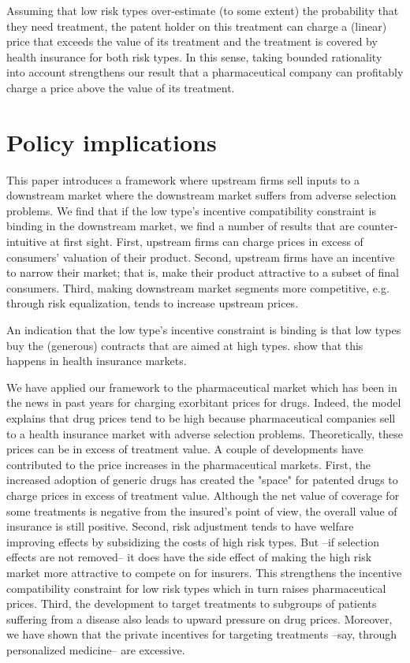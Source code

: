 \documentclass[12pt,english,a4paper]{article}
\begin{document}
Assuming that low risk types over-estimate (to some extent) the probability that they need treatment, the patent holder on this treatment can charge a (linear) price that exceeds the value of its treatment and the treatment is covered by health insurance for both risk types. In this sense, taking bounded rationality into account strengthens our result that a pharmaceutical company can profitably charge a price above the value of its treatment.

\section{Policy implications}
\label{sec:org67f9879}

This paper introduces a framework where upstream firms sell inputs to a downstream market where the downstream market suffers from adverse selection problems. We find that if the low type's incentive compatibility constraint is binding in the downstream market, we find a number of results that are counter-intuitive at first sight. First, upstream firms can charge prices in excess of consumers' valuation of their product. Second, upstream firms have an incentive to narrow their market; that is, make their product attractive to a subset of final consumers. Third, making downstream market segments more competitive, e.g. through risk equalization, tends to increase upstream prices.

An indication that the low type's incentive constraint is binding is that low types buy the (generous) contracts that are aimed at high types. \cite{handel-2015-healt-insur-human} show that this happens in health insurance markets. 

We have applied our framework to the pharmaceutical market which has been in the news in past years for charging exorbitant prices for drugs. Indeed, the model explains that
drug prices tend to be high because pharmaceutical companies sell to a health insurance market with adverse selection problems. Theoretically, these prices can be in excess of treatment value. A couple of developments have contributed to the price increases in the pharmaceutical markets. First, the increased adoption of generic drugs has created the "space" for patented drugs to charge prices in excess of treatment value. Although the net value of coverage for some treatments is negative from the insured's point of view, the overall value of insurance is still positive. Second, risk adjustment tends to have welfare improving effects by subsidizing the costs of high risk types. But --if selection effects are not removed-- it does have the side effect of making the high risk market more attractive to compete on for insurers. This strengthens the incentive compatibility constraint for low risk types which in turn raises pharmaceutical prices. Third, the development to target treatments to subgroups of patients suffering from a disease also leads to upward pressure on drug prices. Moreover, we have shown that the private incentives for targeting treatments --say, through personalized medicine-- are excessive.
\end{document}
